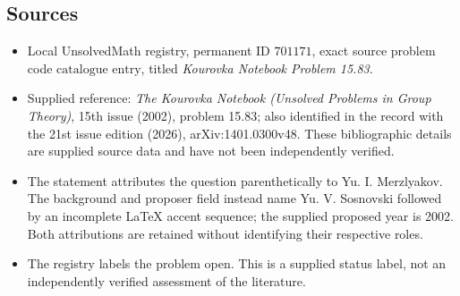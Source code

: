 \documentclass[11pt]{article}
\begin{document}
\subsection{Sources}
\begin{itemize}
\item Local UnsolvedMath registry, permanent ID \(701171\), exact source problem code \(\text{catalogue entry}\), titled \emph{Kourovka Notebook Problem 15.83}.
\item Supplied reference: \emph{The Kourovka Notebook (Unsolved Problems in Group Theory)}, 15th issue (2002), problem 15.83; also identified in the record with the 21st issue edition (2026), arXiv:1401.0300v48. These bibliographic details are supplied source data and have not been independently verified.
\item The statement attributes the question parenthetically to Yu. I. Merzlyakov. The background and proposer field instead name Yu. V. Sosnovski followed by an incomplete LaTeX accent sequence; the supplied proposed year is 2002. Both attributions are retained without identifying their respective roles.
\item The registry labels the problem open. This is a supplied status label, not an independently verified assessment of the literature.
\end{itemize}
\end{document}
